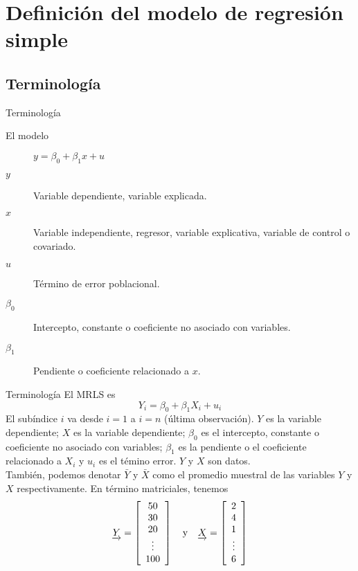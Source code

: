 \section{Definición del modelo de regresión simple}

\subsection{Terminología}
\begin{frame}{Terminología}
	\begin{description}
		\item[El modelo] $y=\beta_{0}+\beta_{1}x+u$
		\pause
		\item[$y$] Variable dependiente, variable explicada.
		\pause
		\item[$x$] Variable independiente, regresor, variable explicativa, variable de control o covariado.
		\pause
		\item[$u$] Término de error poblacional.
		\pause
		\item[$\beta_{0}$] Intercepto, constante o coeficiente no asociado con variables.
		\pause
		\item[$\beta_{1}$] Pendiente o coeficiente relacionado a $x$.
	\end{description}
\end{frame}
\begin{frame}{Terminología}
	El MRLS es {\large $$ Y_{i} = \beta_{0} + \beta_{1}X_{i}+u_{i}$$}El subíndice $i$ va desde $i = 1$ a $i = n$ (última observación). $Y$ es la variable dependiente; $X$ es la variable dependiente; $\beta_{0}$ es el intercepto, constante o coeficiente no asociado con variables; $\beta_{1}$ es la pendiente o el coeficiente relacionado a $X_{i}$ y $u_{i}$ es el témino error. $Y$ y $X$ son datos.\\
	
	También, podemos denotar $\bar{Y}$ y $\bar{X}$ como el promedio muestral de las variables $Y$ y $X$ respectivamente. En término matriciales, tenemos
	$$ \underrightarrow{Y} = \left [ \begin{array}{c}
		50		\\
		30		\\
		20		\\
		\vdots	\\
		100
	\end{array}
	\right] 
	\quad \textup{y} \quad
	\underrightarrow{X} = \left [ \begin{array}{c}
		2		\\
		4		\\
		1		\\
		\vdots	\\
		6
	\end{array}
	\right]$$
\end{frame}
